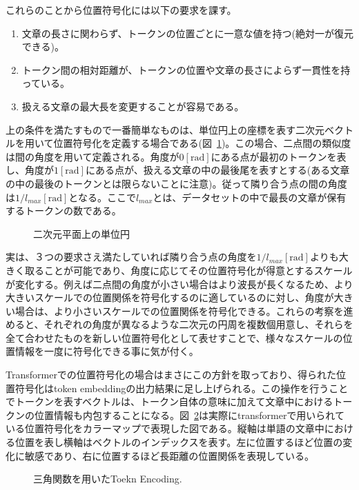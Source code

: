 これらのことから位置符号化には以下の要求を課す。
\begin{enumerate}
  \item 文章の長さに関わらず、トークンの位置ごとに一意な値を持つ(絶対一が復元できる)。
  \item トークン間の相対距離が、トークンの位置や文章の長さによらず一貫性を持っている。
  \item 扱える文章の最大長を変更することが容易である。
\end{enumerate}

上の条件を満たすもので一番簡単なものは、単位円上の座標を表す二次元ベクトルを用いて位置符号化を定義する場合である(図~\ref{fig:pos-encoding-circle})。この場合、二点間の類似度は間の角度を用いて定義される。角度が$0[\text{rad}]$にある点が最初のトークンを表し、角度が$1[\text{rad}]$にある点が、扱える文章の中の最後尾を表すとする(ある文章の中の最後のトークンとは限らないことに注意)。従って隣り合う点の間の角度は$1/l_{max} [\text{rad}]$となる。ここで$l_{max}$とは、データセットの中で最長の文章が保有するトークンの数である。

\begin{figure}
  \centering

  \caption{二次元平面上の単位円}
\label{fig:pos-encoding-circle}

\end{figure}
実は、３つの要求さえ満たしていれば隣り合う点の角度を$1/l_{max} [\text{rad}]$よりも大きく取ることが可能であり、角度に応じてその位置符号化が得意とするスケールが変化する。例えば二点間の角度が小さい場合はより波長が長くなるため、より大きいスケールでの位置関係を符号化するのに適しているのに対し、角度が大きい場合は、より小さいスケールでの位置関係を符号化できる。これらの考察を進めると、それぞれの角度が異なるような二次元の円周を複数個用意し、それらを全て合わせたものを新しい位置符号化として表せすことで、様々なスケールの位置情報を一度に符号化できる事に気が付く。


Transformerでの位置符号化の場合はまさにこの方針を取っており、得られた位置符号化はtoken embeddingの出力結果に足し上げられる。この操作を行うことでトークンを表すベクトルは、トークン自体の意味に加えて文章中におけるトークンの位置情報も内包することになる。図~\ref{fig:tri-pos-encoding}は実際にtransformerで用いられている位置符号化をカラーマップで表現した図である。縦軸は単語の文章中における位置を表し横軸はベクトルのインデックスを表す。左に位置するほど位置の変化に敏感であり、右に位置するほど長距離の位置関係を表現している。
\begin{figure}
  \centering

  \caption{三角関数を用いたToekn Encoding.}
\label{fig:tri-pos-encoding}
\end{figure}

